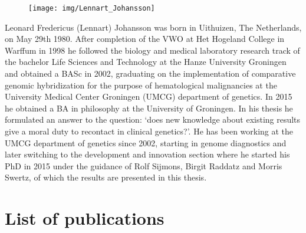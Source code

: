 \begin{appendices}
	\begin{figure}
		\begin{center}
			\texttt{[image: img/Lennart\_Johansson]}
		\end{center}
	\end{figure}
	Leonard Fredericus (Lennart) Johansson was born in Uithuizen, The Netherlands, on May 29th 1980. 
	After completion of the VWO at Het Hogeland College in Warffum in 1998 he followed the biology and medical laboratory research track of the bachelor Life Sciences and Technology at the Hanze University Groningen and obtained a BASc in 2002, graduating on the implementation of comparative genomic hybridization for the purpose of hematological malignancies at the University Medical Center Groningen (UMCG) department of genetics. 
	In 2015 he obtained a BA in philosophy at the University of Groningen. 
	In his thesis he formulated an answer to the question: ‘does new knowledge about existing results give a moral duty to recontact in clinical genetics?’. 
	He has been working at the UMCG department of genetics since 2002, starting in genome diagnostics and later switching to the development and innovation section where he started his PhD in 2015 under the guidance of Rolf Sijmons, Birgit Raddatz and Morris Swertz, of which the results are presented in this thesis.
	
	\chapter{List of publications}
	

\end{appendices}
